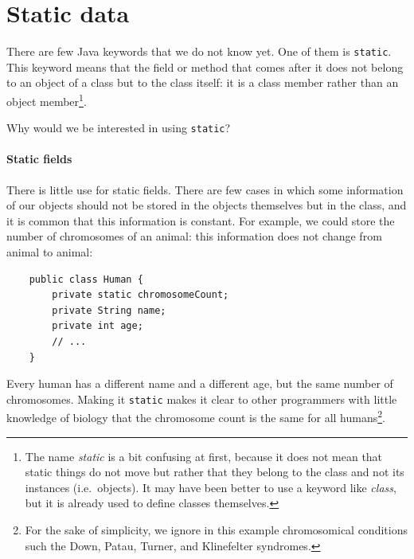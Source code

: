 %

\section{Static data}
\label{sec:static-data}

There are few Java keywords that we do not know yet. One of them is
\verb+static+. This keyword means that the field or method that comes
after it does not belong to an object of a class but to the class
itself: it is a class member rather than an object member\footnote{The
name \emph{static} is a bit confusing at first, because it does not
mean that static things do not move but rather that they belong to the
class and not its instances (i.e.~objects). It may have been better to
use a keyword like \emph{class}, but it is already used to define
classes themselves.}.

Why would we be interested in using \verb+static+? 

\paragraph{Static fields}
\label{sec:static-fields}

There is little use for static fields. There are few cases in which
some information of our objects should not be stored in the objects
themselves but in the class, and it is common that this information is
constant. For example, we could store the number of chromosomes of an
animal: this information does not change from animal to animal:

\begin{verbatim}
    public class Human {
        private static chromosomeCount;
        private String name;
        private int age;
        // ...
    }
\end{verbatim}

Every human has a different name and a different age, but the same
number of chromosomes. Making it \verb+static+ makes it clear to other
programmers with little knowledge of biology that the chromosome count
is the same for all humans\footnote{For the sake of simplicity, we
  ignore in this example chromosomical conditions such the Down,
  Patau, Turner, and Klinefelter syndromes.}. 

